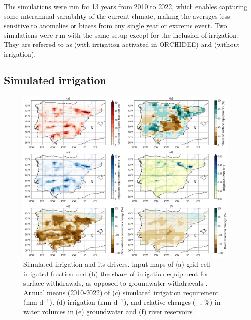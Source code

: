 The simulations were run for 13 years from 2010 to 2022, which enables capturing some interannual variability of the current climate, making the averages less sensitive to anomalies or biases from any single year or extreme event.
Two simulations were run with the same setup except for the inclusion of irrigation. 
They are referred to as \irr (with irrigation activated in ORCHIDEE) and \noirr (without irrigation). 

\subsection{Simulated irrigation}

\begin{figure}[htbp]
    \centering
    \includegraphics[width=\textwidth]{images/chap4/f03.png}
    \caption{Simulated irrigation and its drivers. Input maps of (a) grid cell irrigated fraction \citep[\% , derived from][]{hurtt_harmonization_2020} and (b) the share of irrigation equipment for surface withdrawals, as opposed to groundwater withdrawals \citep[\%, derived from ][]{siebert_groundwater_2010}. Annual means (2010-2022) of (c) simulated irrigation requirement (mm d$^{-1}$), (d) irrigation (mm d$^{-1}$), and relative changes (\irr - \noirr, \%) in water volumes in (e) groundwater and (f) river reservoirs.}
    \label{fig:irrig_maps}
\end{figure}

